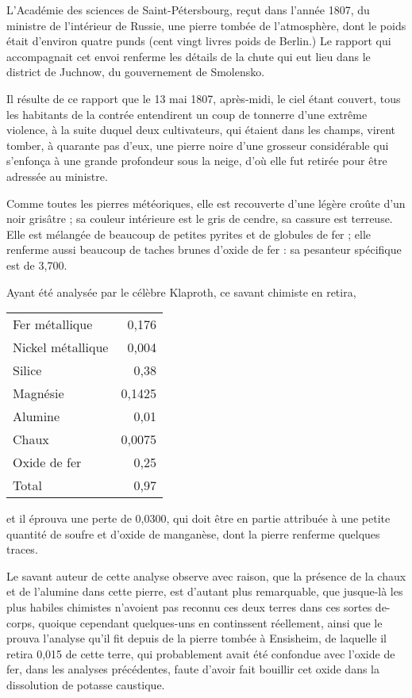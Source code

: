 \documentclass[a4paper, 12pt, oneside, french]{article}
\begin{document}
L'Académie des sciences de Saint-Pétersbourg, reçut dans l'année 1807, du ministre de l'intérieur de Russie, une pierre tombée de l'atmosphère, dont le poids était d'environ quatre punds (cent vingt livres poids de Berlin.) Le rapport qui accompagnait cet envoi renferme les détails de la chute qui eut lieu dans le district de Juchnow, du gouvernement de Smolensko.

Il résulte de ce rapport que le 13 mai 1807, après-midi, le ciel étant couvert, tous les habitants de la contrée entendirent un coup de tonnerre d'une extrême violence, à la suite duquel deux cultivateurs, qui étaient dans les champs, virent tomber, à quarante pas d'eux, une pierre noire d'une grosseur considérable qui s'enfonça à une grande profondeur sous la neige, d'où elle fut retirée pour être adressée au ministre.

Comme toutes les pierres météoriques, elle est recouverte d'une légère croûte d'un noir grisâtre ; sa couleur intérieure est le gris de cendre, sa cassure est terreuse. Elle est mélangée de beaucoup de petites pyrites et de globules de fer ; elle renferme aussi beaucoup de taches brunes d'oxide de fer : sa pesanteur spécifique est de 3,700.

Ayant été analysée par le célèbre Klaproth, ce savant chimiste en retira,
\begin{table}[H]
    \centering
    \begin{tabular}{l r}
        Fer métallique & 0,176 \\
        Nickel métallique & 0,004 \\
        Silice & 0,38 \\
        Magnésie & 0,1425 \\
        Alumine & 0,01 \\
        Chaux & 0,0075 \\
        Oxide de fer & 0,25 \\ \hline
        Total & 0,97 \\
    \end{tabular}
\end{table}
et il éprouva une perte de 0,0300, qui doit être en partie attribuée à une petite quantité de soufre et d'oxide de manganèse, dont la pierre renferme quelques traces.

Le savant auteur de cette analyse observe avec raison, que la présence de la chaux et de l'alumine dans cette pierre, est d'autant plus remarquable, que jusque-là les plus habiles chimistes n'avoient pas reconnu ces deux terres dans ces sortes de-corps, quoique cependant quelques-uns en continssent réellement, ainsi que le prouva l'analyse qu'il fit depuis de la pierre tombée à Ensisheim, de laquelle il retira 0,015 de cette terre, qui probablement avait été confondue avec l'oxide de fer, dans les analyses précédentes, faute d'avoir fait bouillir cet oxide dans la dissolution de potasse caustique.
\end{document}
